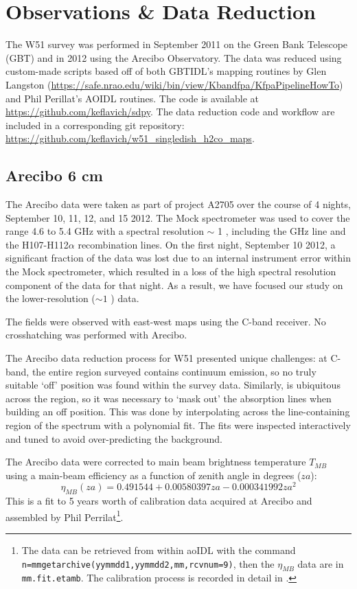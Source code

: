 \section{Observations \& Data Reduction}
\label{sec:observations}
The W51 survey was performed in September 2011 on the Green Bank Telescope
(GBT) and in 2012 using the Arecibo Observatory.  
The data was reduced using custom-made scripts based off of both GBTIDL's
mapping routines by Glen Langston
(\url{https://safe.nrao.edu/wiki/bin/view/Kbandfpa/KfpaPipelineHowTo}) and Phil
Perillat's AOIDL routines.  The code is available at
\url{https://github.com/keflavich/sdpy}.  The data reduction code and workflow
are included in a corresponding git repository:
\url{https://github.com/keflavich/w51_singledish_h2co_maps}.

\subsection{Arecibo 6 cm}
The Arecibo data were taken as part of project A2705 over the course of 4
nights, September 10, 11, 12, and 15 2012.  The Mock spectrometer
was used to cover the range 4.6 to 5.4 GHz with a spectral resolution $\sim$ 1
\kms, including the  GHz line and the H107-H112$\alpha$
recombination lines. On the first night, September 10
2012, a significant fraction of the data was lost due to an internal instrument
error within the Mock spectrometer, which resulted in a loss of the
high spectral resolution component of the \formaldehyde data for that night.  As a
result, we have focused our study on the lower-resolution ($\sim1$ \kms) data.

The fields were observed with east-west maps using the C-band receiver.  No
crosshatching was performed with Arecibo.

The Arecibo data reduction process for W51
presented unique challenges: at C-band, the entire region surveyed contains
continuum emission, so no truly suitable `off' position was found within the
survey data.  Similarly, \formaldehyde is ubiquitous across the region, so it
was necessary to `mask out' the absorption lines when building an off position.
This was done by interpolating across the line-containing region of the
spectrum with a polynomial fit.  The fits were inspected interactively and
tuned to avoid over-predicting the background.

The Arecibo data were corrected to main beam brightness temperature $T_{MB}$
using a main-beam efficiency as a function of zenith angle in degrees ($za$):
$$\eta_{MB}(za) = 0.491544 + 0.00580397 za - 0.000341992 za^2$$
This is a fit to 5 years worth of calibration data acquired at Arecibo and
assembled by Phil Perrilat\footnote{The data can be retrieved from within aoIDL
with the command \texttt{n=mmgetarchive(yymmdd1,yymmdd2,mm,rcvnum=9)}, then
the $\eta_{MB}$ data are in \texttt{mm.fit.etamb}.  The calibration process is
recorded in detail in \citet{Heiles2001a}.}.


